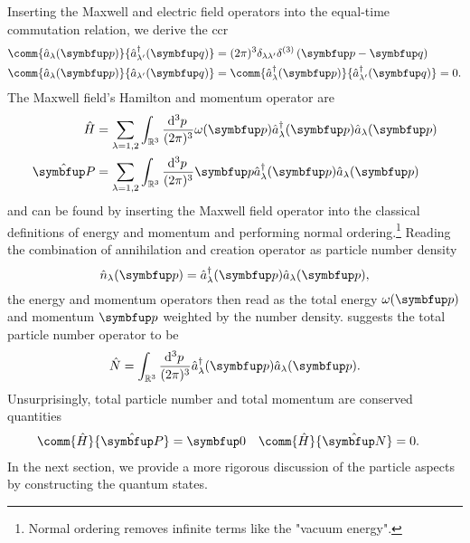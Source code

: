 Inserting the Maxwell and electric field operators into the equal-time commutation relation, we derive the \gls{ccr}
\begin{align}
	\comm{\hat{a}_\lambda(\vb{p})}{\hat{a}_{\lambda^\prime}^\dagger(\vb{q})}
	&=
	(2\pi)^3
	\delta_{\lambda\lambda^\prime}
	\delta^{(3)}\left(\vb{p}-\vb{q}\right)
	\label{eq:canonical_commutation_relation_nonzero}
	\\
	\comm{\hat{a}_\lambda(\vb{p})}{\hat{a}_{\lambda^\prime}(\vb{q})}
	&=
	\comm{\hat{a}_\lambda^\dagger(\vb{p})}{\hat{a}_{\lambda^\prime}^\dagger(\vb{q})}
	=
	0
	\label{eq:canonical_commutation_relation_zero}
	.
\end{align}
The Maxwell field's Hamilton and momentum operator are~\cite[p.~199]{Greiner2013}
\begin{align}
	\hat{H}
	&=
	\sum_{\lambda=1,2}
	\int_{\mathbb{R}^3}\frac{\dd[3]{p}}{(2\pi)^3}
	\omega(\vb{p})
	\hat{a}_\lambda^\dagger(\vb{p})
	\hat{a}_\lambda(\vb{p})
	\label{eq:maxwell_hamilton_operator}
	\\
	\vu{P}
	&=
	\sum_{\lambda=1,2}
	\int_{\mathbb{R}^3}\frac{\dd[3]{p}}{(2\pi)^3}
	\vb{p}
	\hat{a}_\lambda^\dagger(\vb{p})
	\hat{a}_\lambda(\vb{p})
	\label{eq:maxwell_momentum_operator}
\end{align}
and can be found by inserting the Maxwell field operator into the classical definitions of energy and momentum and performing normal ordering.\footnote{Normal ordering removes infinite terms like the "vacuum energy".}
Reading the combination of annihilation and creation operator as particle number density
\begin{equation}
	\hat{n}_\lambda(\vb{p})
	=
	\hat{a}_\lambda^\dagger(\vb{p})
	\hat{a}_\lambda(\vb{p})
	\label{eq:maxwell_number_density_operator}
	,
\end{equation}
the energy and momentum operators then read as the total energy $\omega(\vb{p})$ and momentum $\vb{p}$ weighted by the number density.
 suggests the total particle number operator to be
\begin{equation}
	\hat{N}
	=
	\int_{\mathbb{R}^3}\frac{\dd[3]{p}}{(2\pi)^3}
	\hat{a}_\lambda^\dagger(\vb{p})
	\hat{a}_\lambda(\vb{p})
	\label{eq:maxwell_number_operator}
	.
\end{equation}
Unsurprisingly, total particle number and total momentum are conserved quantities
\begin{align}
	\comm{\hat{H}}{\vu{P}}
	&=
	\vb{0}
	&
	\comm{\hat{H}}{\vu{N}}
	&=
	0
	.
\end{align}
In the next section, we provide a more rigorous discussion of the particle aspects by constructing the quantum states.